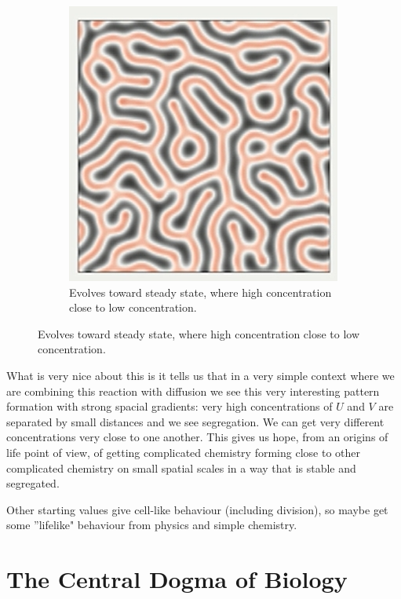 \documentclass[]{article}
\begin{document}
\begin{figure}[H]
\begin{subfigure}[b]{0.3\textwidth}
	\end{subfigure}
	\begin{subfigure}[b]{0.3\textwidth}
		\centering
		\caption{Evolves toward steady state,  where high concentration close to low concentration.}
		\includegraphics[width=\textwidth]{GreyScottFinal}
	\end{subfigure}
\end{figure}

What is very nice about this is it tells us that in a very simple context where we are combining this reaction with diffusion we see this very interesting pattern formation with strong spacial gradients: very high concentrations of $U$ and $V$ are separated by small distances and we see segregation. We can get very different concentrations very close to one another. This gives us hope, from an origins of life point of view, of getting complicated chemistry forming close to other complicated chemistry on small spatial scales in a way that is stable and segregated. 

Other starting values give cell-like behaviour (including division), so maybe get some ''lifelike" behaviour from physics and simple chemistry.

\section{The Central Dogma of Biology}
\end{document}
